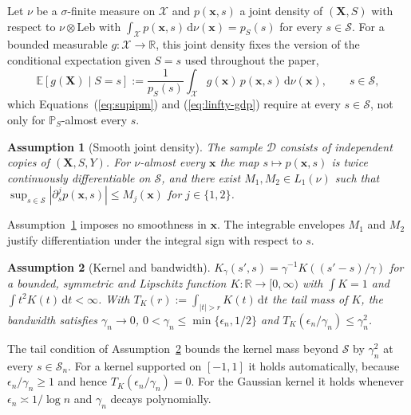 \documentclass{article} %
\newtheorem{assumption}{Assumption}
\begin{document}
Let $\nu$ be a $\sigma$-finite measure on $\mathcal{X}$ and $p(\mathbf{x},s)$ a joint density of $(\mathbf{X},S)$ with respect to $\nu\otimes\mathrm{Leb}$ with $\int_{\mathcal{X}}p(\mathbf{x},s)\,\mathrm{d}\nu(\mathbf{x})=p_S(s)$ for every $s\in\mathcal{S}$.  For a bounded measurable $g:\mathcal{X}\to\mathbb{R}$, this joint density fixes the version of the conditional expectation given $S=s$ used throughout the paper,
\begin{equation}
  \mathbb{E}[g(\mathbf{X})\mid S=s]
  :=\frac{1}{p_S(s)}\int_{\mathcal{X}} g(\mathbf{x})\,p(\mathbf{x},s)\,\mathrm{d}\nu(\mathbf{x}),
  \qquad s\in\mathcal{S},
  \label{eq:pointwise-conditional}
\end{equation}
which Equations~(\ref{eq:supipm}) and (\ref{eq:linfty-gdp}) require at every $s\in\mathcal{S}$, not only for $\mathbb{P}_S$-almost every $s$.

\begin{assumption}[Smooth joint density]
\label{as:smooth-density}
The sample $\mathcal{D}$ consists of independent copies of $(\mathbf{X},S,Y)$.  For $\nu$-almost every $\mathbf{x}$ the map $s\mapsto p(\mathbf{x},s)$ is twice continuously differentiable on $\mathcal{S}$, and there exist $M_1,M_2\in L_1(\nu)$ such that $\sup_{s\in\mathcal{S}}\left|\partial_s^{j}p(\mathbf{x},s)\right|\le M_j(\mathbf{x})$ for $j\in\{1,2\}$.
\end{assumption}

Assumption~\ref{as:smooth-density} imposes no smoothness in $\mathbf{x}$.  The integrable envelopes $M_1$ and $M_2$ justify differentiation under the integral sign with respect to $s$.

\begin{assumption}[Kernel and bandwidth]
\label{as:kernel}
$K_{\gamma}(s',s)=\gamma^{-1}K((s'-s)/\gamma)$ for a bounded, symmetric and Lipschitz function $K:\mathbb{R}\to[0,\infty)$ with $\int K=1$ and $\int t^2K(t)\,\mathrm{d}t<\infty$.  With $T_K(r):=\int_{|t|>r}K(t)\,\mathrm{d}t$ the tail mass of $K$, the bandwidth satisfies $\gamma_n\to0$, $0<\gamma_n\le\min\{\epsilon_n,1/2\}$ and $T_K(\epsilon_n/\gamma_n)\le\gamma_n^2$.
\end{assumption}

The tail condition of Assumption~\ref{as:kernel} bounds the kernel mass beyond $\mathcal{S}$ by $\gamma_n^2$ at every $s\in\mathcal{S}_n$.  For a kernel supported on $[-1,1]$ it holds automatically, because $\epsilon_n/\gamma_n\ge1$ and hence $T_K(\epsilon_n/\gamma_n)=0$.  For the Gaussian kernel it holds whenever $\epsilon_n\asymp1/\log n$ and $\gamma_n$ decays polynomially.
\end{document}
